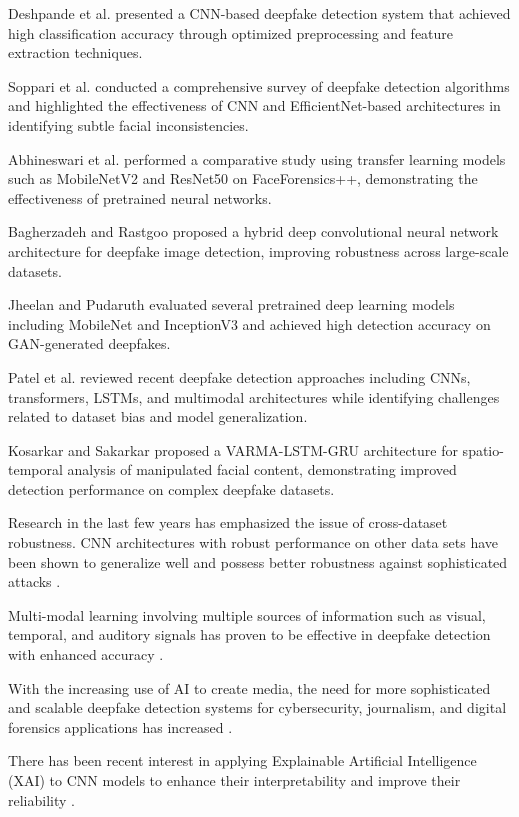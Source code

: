 \documentclass[conference]{IEEEtran}
\begin{document}
Deshpande et al. \cite{b4} presented a CNN-based deepfake detection system that achieved high classification accuracy through optimized preprocessing and feature extraction techniques.

Soppari et al. \cite{b5} conducted a comprehensive survey of deepfake detection algorithms and highlighted the effectiveness of CNN and EfficientNet-based architectures in identifying subtle facial inconsistencies.

Abhineswari et al. \cite{b6} performed a comparative study using transfer learning models such as MobileNetV2 and ResNet50 on FaceForensics++, demonstrating the effectiveness of pretrained neural networks.

Bagherzadeh and Rastgoo \cite{b7} proposed a hybrid deep convolutional neural network architecture for deepfake image detection, improving robustness across large-scale datasets.

Jheelan and Pudaruth \cite{b8} evaluated several pretrained deep learning models including MobileNet and InceptionV3 and achieved high detection accuracy on GAN-generated deepfakes.

Patel et al. \cite{b9} reviewed recent deepfake detection approaches including CNNs, transformers, LSTMs, and multimodal architectures while identifying challenges related to dataset bias and model generalization.

Kosarkar and Sakarkar \cite{b10} proposed a VARMA-LSTM-GRU architecture for spatio-temporal analysis of manipulated facial content, demonstrating improved detection performance on complex deepfake datasets.

Research in the last few years has emphasized the issue of cross-dataset robustness. CNN architectures with robust performance on other data sets have been shown to generalize well and possess better robustness against sophisticated attacks \cite{b11}.

Multi-modal learning involving multiple sources of information such as visual, temporal, and auditory signals has proven to be effective in deepfake detection with enhanced accuracy \cite{b12,b13}.

With the increasing use of AI to create media, the need for more sophisticated and scalable deepfake detection systems for cybersecurity, journalism, and digital forensics applications has increased \cite{b14}.

There has been recent interest in applying Explainable Artificial Intelligence (XAI) to CNN models to enhance their interpretability and improve their reliability \cite{b15}.
\end{document}
